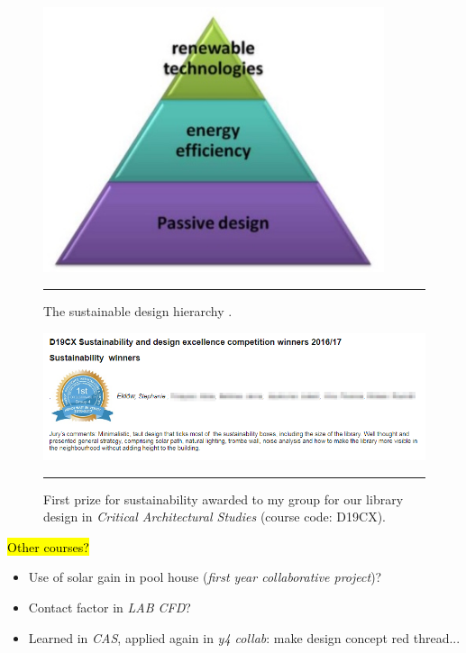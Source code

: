 \begin{figure}[htbp]
	\centering
	\includegraphics[width=10cm]{figures/Hierarchy.jpg}
	\rule{\textwidth}{0.5pt} %
	\caption{The sustainable design hierarchy \citep{Dougherty:online}.}
	\label{fig_hierarchy}
\end{figure}


\begin{figure}[htbp]
	\centering
	\includegraphics[width=\textwidth]{figures/SustainabilityAward.png}
	\rule{\textwidth}{0.5pt} %
	\caption{First prize for sustainability awarded to my group for our library design in \textit{Critical Architectural Studies} (course code: D19CX).}
	\label{fig_award}
\end{figure}

\hl{Other courses?}
\begin{itemize}
	\item Use of solar gain in pool house (\textit{first year collaborative project})?
	\item Contact factor in \textit{LAB CFD}?
	\item Learned in \textit{CAS}, applied again in \textit{y4 collab}: make design concept red thread...
\end{itemize}



